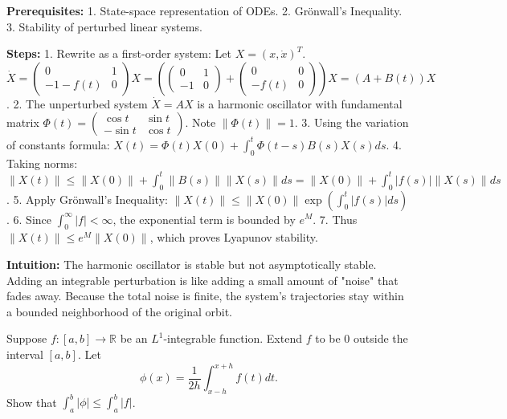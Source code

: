 \begin{solution}
\textbf{Prerequisites:}
1. State-space representation of ODEs.
2. Gr\"onwall's Inequality.
3. Stability of perturbed linear systems.

\textbf{Steps:}
1. Rewrite as a first-order system: Let $X = (x, \dot{x})^T$.
$\dot{X} = \begin{pmatrix} 0 & 1 \\ -1-f(t) & 0 \end{pmatrix} X = \left( \begin{pmatrix} 0 & 1 \\ -1 & 0 \end{pmatrix} + \begin{pmatrix} 0 & 0 \\ -f(t) & 0 \end{pmatrix} \right) X = (A + B(t))X$.
2. The unperturbed system $\dot{X} = AX$ is a harmonic oscillator with fundamental matrix $\Phi(t) = \begin{pmatrix} \cos t & \sin t \\ -\sin t & \cos t \end{pmatrix}$. Note $\|\Phi(t)\| = 1$.
3. Using the variation of constants formula: $X(t) = \Phi(t)X(0) + \int_0^t \Phi(t-s)B(s)X(s)ds$.
4. Taking norms: $\|X(t)\| \leq \|X(0)\| + \int_0^t \|B(s)\| \|X(s)\| ds = \|X(0)\| + \int_0^t |f(s)| \|X(s)\| ds$.
5. Apply Gr\"onwall's Inequality: $\|X(t)\| \leq \|X(0)\| \exp(\int_0^t |f(s)| ds)$.
6. Since $\int_0^\infty |f| < \infty$, the exponential term is bounded by $e^M$.
7. Thus $\|X(t)\| \leq e^M \|X(0)\|$, which proves Lyapunov stability.

\textbf{Intuition:}
The harmonic oscillator is stable but not asymptotically stable. Adding an integrable perturbation is like adding a small amount of "noise" that fades away. Because the total noise is finite, the system's trajectories stay within a bounded neighborhood of the original orbit.
\end{solution}

\begin{exercise}
\label{analysis:2010:10}
Suppose $f : [a, b] \to \mathbb{R}$ be an $L^1$-integrable function. Extend $f$ to be 0 outside the interval $[a, b]$. Let
\[
\phi(x) = \frac{1}{2h} \int_{x-h}^{x+h} f(t) dt.
\]
Show that $\int_a^b |\phi| \leq \int_a^b |f|$.
\end{exercise}

